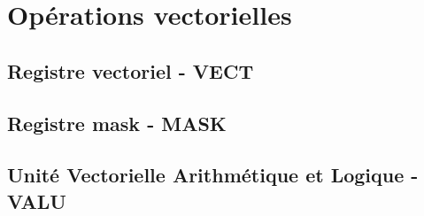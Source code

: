 \chapter{Opérations vectorielles}

\section{Registre vectoriel - VECT}

\section{Registre mask - MASK}

\section{Unité Vectorielle Arithmétique et Logique - VALU}
